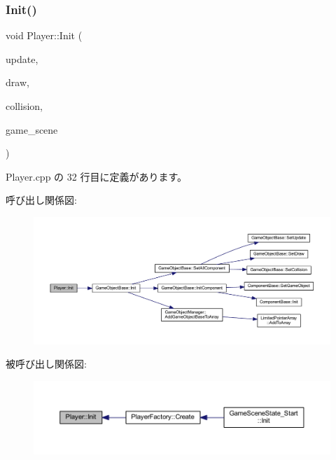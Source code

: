 \subsubsection{\texorpdfstring{Init()}{Init()}}
{\footnotesize\ttfamily void Player\+::\+Init (\begin{DoxyParamCaption}\item[{\mbox{\hyperlink{class_update_base}{Update\+Base}} $\ast$}]{update,  }\item[{\mbox{\hyperlink{class_draw_base}{Draw\+Base}} $\ast$}]{draw,  }\item[{\mbox{\hyperlink{class_collision_base}{Collision\+Base}} $\ast$}]{collision,  }\item[{\mbox{\hyperlink{class_game_scene}{Game\+Scene}} $\ast$}]{game\+\_\+scene }\end{DoxyParamCaption})}



 Player.\+cpp の 32 行目に定義があります。

呼び出し関係図\+:\nopagebreak
\begin{figure}[H]
\begin{center}
\leavevmode
\includegraphics[width=350pt]{class_player_a171167a4b1a6dddbe94b8f3c6f7462c4_cgraph}
\end{center}
\end{figure}
被呼び出し関係図\+:\nopagebreak
\begin{figure}[H]
\begin{center}
\leavevmode
\includegraphics[width=350pt]{class_player_a171167a4b1a6dddbe94b8f3c6f7462c4_icgraph}
\end{center}
\end{figure}
\mbox{\label{class_player_a457153d0edd58932e37e1356f5fe5fed}} 
